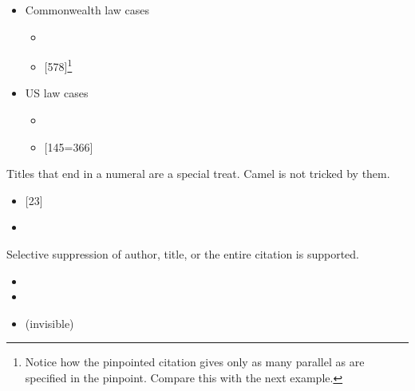 \documentclass{article}
\begin{document}
\begin{itemize}
\begin{itemize}
  \end{itemize}
\item Commonwealth law cases
  \begin{itemize}
  \item {}
  \item {}[578]\footnote{Notice how the
      pinpointed citation gives only as many parallel as are
      specified in the pinpoint.  Compare this with the next example.}
  \end{itemize}
\item US law cases
  \begin{itemize}
  \item {}
  \item {}[145=366]
  \end{itemize}
\end{itemize}
Titles that end in a numeral are a special treat.  {\sc Camel}
is not tricked by them.
\begin{itemize}
  \item {}[23]
  \item {}
\end{itemize}
Selective suppression of author, title, or the entire citation is
supported.
\begin{itemize}
  \item {}
  \item {}
  \item {} (invisible)
\end{itemize}

\end{document}
